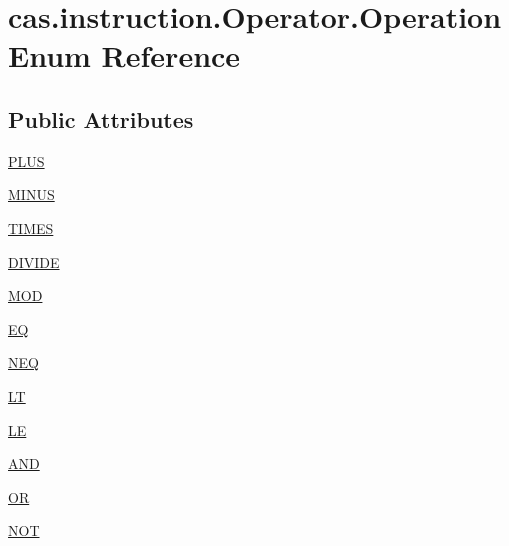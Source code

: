 \hypertarget{enumcas_1_1instruction_1_1_operator_1_1_operation}{\section{cas.\-instruction.\-Operator.\-Operation Enum Reference}
\label{enumcas_1_1instruction_1_1_operator_1_1_operation}
}
\subsection*{Public Attributes}
\begin{DoxyCompactItemize}
\item 
\hyperlink{enumcas_1_1instruction_1_1_operator_1_1_operation_a913f6c7e9a127ba4c988c8c66ac56bb8}{P\-L\-U\-S}
\item 
\hyperlink{enumcas_1_1instruction_1_1_operator_1_1_operation_adfb410fa8cfee05f1359aa7af5898b70}{M\-I\-N\-U\-S}
\item 
\hyperlink{enumcas_1_1instruction_1_1_operator_1_1_operation_a2b08437555339e464fdeffc9dbbde68d}{T\-I\-M\-E\-S}
\item 
\hyperlink{enumcas_1_1instruction_1_1_operator_1_1_operation_ad6116eecb86a01fa99db461fec44da3e}{D\-I\-V\-I\-D\-E}
\item 
\hyperlink{enumcas_1_1instruction_1_1_operator_1_1_operation_a20eea59278d9d18fe1b14c9e0d19aea1}{M\-O\-D}
\item 
\hyperlink{enumcas_1_1instruction_1_1_operator_1_1_operation_a2d610c17fb28c5feae027aebe25006f2}{E\-Q}
\item 
\hyperlink{enumcas_1_1instruction_1_1_operator_1_1_operation_a14636507d2e02eec58a93273a359a15a}{N\-E\-Q}
\item 
\hyperlink{enumcas_1_1instruction_1_1_operator_1_1_operation_ad938ac9e4078e59766281a3466c411a0}{L\-T}
\item 
\hyperlink{enumcas_1_1instruction_1_1_operator_1_1_operation_a6da738dd3d3efde3339d7eaa18de627f}{L\-E}
\item 
\hyperlink{enumcas_1_1instruction_1_1_operator_1_1_operation_afe4d75c3d8d4aa843f4e066011c1b0a6}{A\-N\-D}
\item 
\hyperlink{enumcas_1_1instruction_1_1_operator_1_1_operation_ad585e9c3a6e718d322803d6312a27b50}{O\-R}
\item 
\hyperlink{enumcas_1_1instruction_1_1_operator_1_1_operation_adcaa466f402ba31eb1422aedd9944403}{N\-O\-T}
\end{DoxyCompactItemize}


